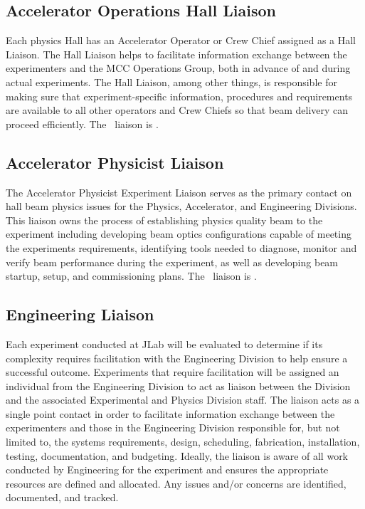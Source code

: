 \documentclass[11pt]{article}
\begin{document}
\subsection{Accelerator Operations Hall Liaison}
\indent

Each physics Hall has an Accelerator Operator or Crew Chief assigned as a Hall Liaison. 
The Hall Liaison helps to facilitate information exchange between the
experimenters and the MCC Operations Group, both in advance of and during
actual experiments. The Hall Liaison, among other things, is responsible 
for making sure that experiment-specific information, procedures and requirements 
are available to all other operators and Crew Chiefs so that beam delivery can proceed efficiently. The \HALL\ liaison is \ACCDIVLIAISON.

\subsection{Accelerator Physicist Liaison}
\indent

The Accelerator Physicist Experiment Liaison serves as the primary contact on hall beam physics issues 
for the Physics, Accelerator, and Engineering Divisions. This liaison owns the process of establishing 
physics quality beam to the experiment including developing beam optics configurations capable of 
meeting the experiments requirements, identifying tools needed to diagnose, monitor and verify 
beam performance during the experiment, as well as developing beam startup, setup, and commissioning 
plans. The \HALL\ liaison is \AccPhysLiaison.


\subsection{Engineering Liaison}
\indent

Each experiment conducted at JLab will be evaluated to determine if its complexity requires facilitation 
with the Engineering Division to help ensure a successful outcome.  Experiments that require 
facilitation will be assigned an individual from the Engineering Division to act as liaison 
between the Division and the associated Experimental and Physics Division staff. The liaison 
acts as a single point contact in order to facilitate information exchange 
between the experimenters and those in the Engineering Division responsible for, 
but not limited to, the systems requirements, design, scheduling, fabrication, 
installation, testing, documentation, and budgeting. Ideally, the liaison 
is aware of all work conducted by Engineering for the experiment and ensures 
the appropriate resources are defined and allocated. Any issues and/or concerns are identified, 
documented, and tracked.
\end{document}
